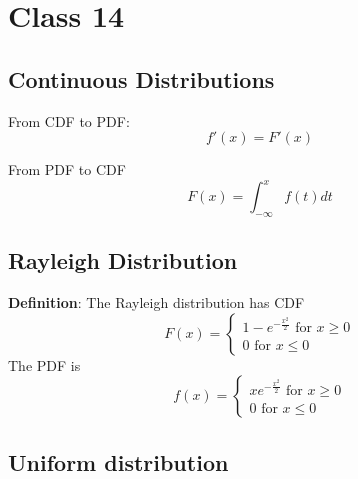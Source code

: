 \chapter{Class 14}

\section{Continuous Distributions}

From CDF to PDF: 
\[
  f'(x) = F'(x)
\] 

From PDF to CDF
\[
  F(x) = \int_{-\infty}^{x} f(t) dt 
\] 

\section{Rayleigh Distribution}

\begin{framed}
   \textbf{Definition}: The Rayleigh distribution has CDF
   \[
     F(x) = 
     \begin{cases}
        1 - e^{- \frac{x^2}{2}} \text{ for } x \geq 0  \\
        0 \text{ for } x \leq 0
     \end{cases}
   \] 
   The PDF is
   \[
     f(x) = 
     \begin{cases}
        xe^{ - \frac{x^2}{2}} \text{ for } x \geq 0 \\
        0 \text{ for } x \leq 0
     \end{cases}
   \] 
\end{framed}

\section{Uniform distribution}

